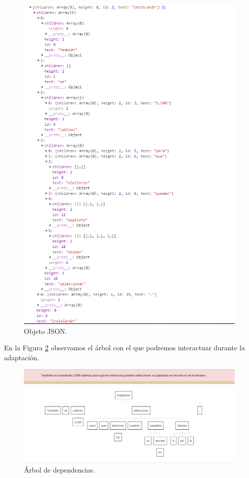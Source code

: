 		\begin{figure}[h!]
		\centering
		
		
		\includegraphics[scale=0.5]{Imagenes/Figuras/ObjetoArbolEjemplo}
		
		
		\caption{Objeto JSON.}
		\label{fig:objetoJSON}
	\end{figure}

En la Figura \ref{fig:arbolDependencias} observamos el árbol con el que podremos interactuar durante la adaptación.
	
		\begin{figure}[h!]
		\centering
		
		
		\includegraphics[scale=0.6]{Imagenes/Figuras/ArbolEjemploObjeto}
		
		
		\caption{Árbol de dependencias.}
		\label{fig:arbolDependencias}
	\end{figure}
	

